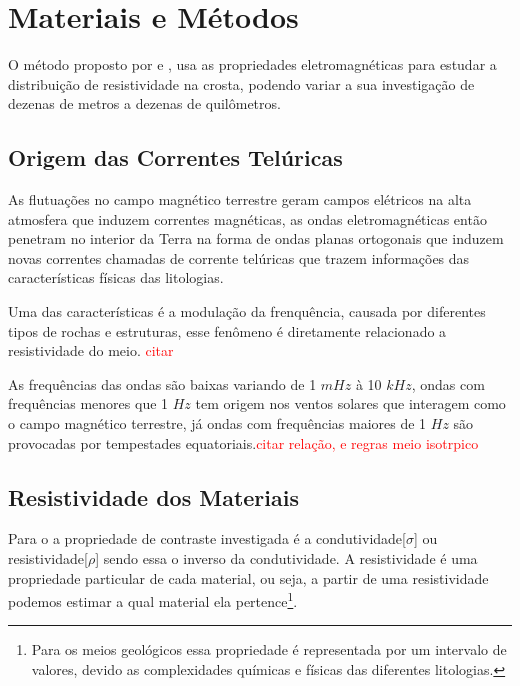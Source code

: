 \chapter{Materiais e Métodos}
    \label{cap-materiais}    
    
    O método \MT proposto por \citeauthor{tikhonov50} \citeyearpar{tikhonov50} e
    \citeauthor{cagniard53} \citeyearpar{cagniard53}, usa as propriedades
    eletromagnéticas para estudar a distribuição de resistividade na crosta, 
    podendo variar a sua investigação de dezenas de metros a dezenas de 
    quilômetros.
    
    \section{Origem das Correntes Telúricas}
    
    As flutuações no campo magnético terrestre geram campos elétricos na alta atmosfera que induzem correntes magnéticas, as ondas eletromagnéticas então penetram no interior da Terra na forma de ondas planas ortogonais que induzem novas correntes chamadas de corrente telúricas que trazem informações das características físicas das litologias. 
    
    Uma das características é a modulação da frenquência, causada por diferentes tipos de rochas e estruturas, esse fenômeno é diretamente 
	relacionado a resistividade do meio. \textcolor{red}{citar}
    
    As frequências das ondas são baixas variando de 1 $mHz$ à 10 $kHz$, ondas com frequências menores que 1 $Hz$ tem origem nos ventos solares que interagem como o campo magnético terrestre, já ondas com frequências maiores de 1 $Hz$ são provocadas por tempestades equatoriais.\textcolor{red}{citar  relação, e regras meio isotrpico}
    
    \section{Resistividade dos Materiais}
    
    Para o \MT a propriedade de contraste investigada é a condutividade[$\sigma$] ou resistividade[$\rho$] sendo essa o inverso da condutividade.
    A resistividade é uma propriedade particular de cada material, ou seja, a partir de uma resistividade podemos estimar a qual material ela pertence\footnote{Para os meios geológicos essa propriedade é representada por um intervalo de valores, devido as complexidades químicas e físicas das diferentes litologias.}.
    
